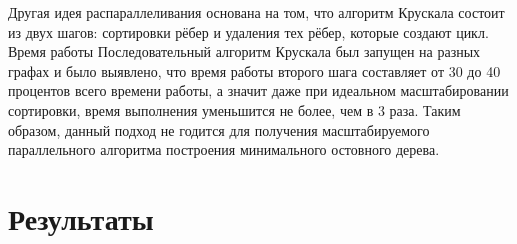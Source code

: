 \documentclass[a4paper,12pt]{extarticle}
\let\stdsection\section
\renewcommand\section{
    \newpage
    \stdsection
}
\begin{document}
Другая идея распараллеливания основана на том, что алгоритм Крускала состоит из двух шагов: сортировки рёбер и удаления тех рёбер, которые создают цикл. 
Время работы 
Последовательный алгоритм Крускала был запущен на разных графах и было выявлено, что время работы второго шага составляет от 30 до 40 процентов всего времени работы, а значит даже при идеальном масштабировании сортировки, время выполнения уменьшится не более, чем в 3 раза.
Таким образом, данный подход не годится для получения масштабируемого параллельного алгоритма построения минимального остовного дерева.




\section{Результаты}
\label{sec:results}
\end{document}
